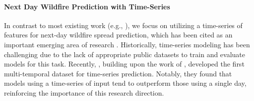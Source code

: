 \paragraph{Next Day Wildfire Prediction with Time-Series} In contrast to most existing work (e.g., \cite{li2024wildfire, fitzgerald2023paying, shah2023wildfire, xiao2024wildfire}), we focus on utilizing a time-series of features for next-day wildfire spread prediction, which has been cited as an important emerging area of research \cite{fitzgerald2023paying, gerard2023wildfirespreadts, li2024wildfire}.  Historically, time-series modeling has been challenging due to the lack of appropriate public datasets to train and evaluate models for this task. Recently, \cite{gerard2023wildfirespreadts}, building upon the work of \cite{huot2022next}, developed the first multi-temporal dataset for time-series prediction.  Notably, they found that models using a time-series of input tend to outperform those using a single day, reinforcing the importance of this research direction. %

